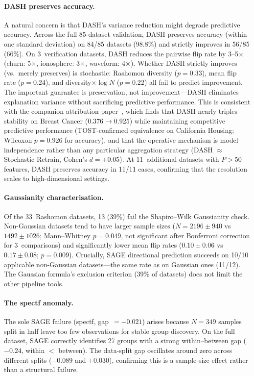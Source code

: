 \documentclass[11pt,a4paper]{article}
\begin{document}
\paragraph{DASH preserves accuracy.}
A natural concern is that DASH's variance reduction might degrade
predictive accuracy.  Across the full 85-dataset validation, DASH
preserves accuracy (within one standard deviation) on 84/85 datasets
(98.8\%) and strictly improves in 56/85 (66\%).  On 3~verification
datasets, DASH reduces the pairwise flip rate by
3--5$\times$ (churn: 5$\times$, ionosphere: 3$\times$, waveform:
4$\times$).  Whether DASH strictly improves (vs.\ merely preserves)
is stochastic: Rashomon diversity ($p = 0.33$), mean flip rate
($p = 0.24$), and diversity$\times\log N$ ($p = 0.22$) all fail
to predict improvement.  The important guarantee is preservation,
not improvement---DASH eliminates explanation variance without
sacrificing predictive performance.
This is consistent with the companion attribution
paper~\citep{caraker2026dash}, which finds that DASH nearly triples
stability on Breast Cancer ($0.376 \to 0.925$) while maintaining
competitive predictive performance (TOST-confirmed equivalence on
California Housing; Wilcoxon $p = 0.926$ for accuracy), and that
the operative mechanism is model independence rather than any
particular aggregation strategy (DASH $\approx$ Stochastic Retrain,
Cohen's $d = +0.05$).  At 11~additional datasets with $P > 50$
features, DASH preserves accuracy in 11/11 cases, confirming that the
resolution scales to high-dimensional settings.

\paragraph{Gaussianity characterisation.}
Of the 33~Rashomon datasets, 13 (39\%) fail the Shapiro--Wilk
Gaussianity check.  Non-Gaussian datasets tend to have larger sample
sizes ($N = 2196 \pm 940$ vs $1492 \pm 1026$; Mann--Whitney $p = 0.049$,
not significant after Bonferroni correction for 3~comparisons)
and significantly lower mean flip rates ($0.10 \pm 0.06$ vs $0.17 \pm 0.08$;
$p = 0.009$).  Crucially, SAGE directional prediction succeeds on
10/10 applicable non-Gaussian datasets---the same rate as on Gaussian
ones (11/12).  The Gaussian formula's exclusion criterion (39\% of
datasets) does not limit the other pipeline tools.

\paragraph{The spectf anomaly.}
The sole SAGE failure (spectf, gap~$= -0.021$) arises because
$N = 349$ samples split in half leave too few observations for stable
group discovery.  On the full dataset, SAGE correctly identifies 27
groups with a strong within--between gap ($-0.24$, within $< $
between).  The data-split gap oscillates around zero across different
splits ($-0.089$ and $+0.030$), confirming this is a sample-size
effect rather than a structural failure.
\end{document}
